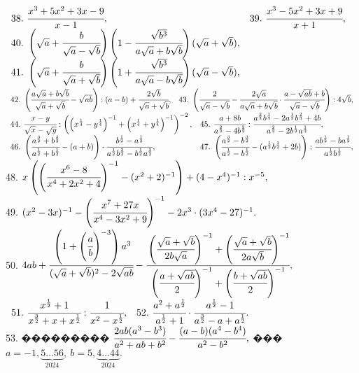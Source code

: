 \documentclass[12pt]{article}
\begin{document}
$\begin{array}{ll}
38.\ \cfrac{x^3+5x^2+3x-9}{x-1},&
39.\ \cfrac{x^3-5x^2+3x+9}{x+1},\\
40.\ \left(\sqrt{a}+\cfrac{b}{\sqrt{a}-\sqrt{b}}\right)\left(1-\cfrac{\sqrt{b^3}}{a\sqrt{a}+b\sqrt{b}}\right)
(\sqrt{a}+\sqrt{b}),\\
41.\ \left(\sqrt{a}+\cfrac{b}{\sqrt{a}+\sqrt{b}}\right)\left(1+\cfrac{\sqrt{b^3}}{a\sqrt{a}-b\sqrt{b}}\right)
(\sqrt{a}-\sqrt{b}),\end{array}$\\
$\begin{array}{ll}
42.\ \left(\cfrac{a\sqrt{a}+b\sqrt{b}}{\sqrt{a}+\sqrt{b}}-\sqrt{ab}\right):(a-b)+\cfrac{2\sqrt{b}}{\sqrt{a}+\sqrt{b}},&
43.\ \left(\cfrac{2}{\sqrt{a}-\sqrt{b}}-\cfrac{2\sqrt{a}}{a\sqrt{a}+b\sqrt{b}}\cdot\cfrac{a-\sqrt{ab}+b}{\sqrt{a}-\sqrt{b}}\right):4\sqrt{b},\end{array}$\\
$\begin{array}{ll}
44.\ \cfrac{x-y}{\sqrt{x}-\sqrt{y}}:\left(\left(x^\frac{1}{4}-y^\frac{1}{4}\right)^{-1}+\left(x^\frac{1}{4}+y^\frac{1}{4}\right)^{-1}\right)^{-2},&
45.\ \cfrac{a+8b}{a^\frac{2}{3}-4b^\frac{2}{3}}:\cfrac{a^\frac{2}{3}b^\frac{1}{3}-2a^\frac{1}{3}b^\frac{2}{3}+4b}{a^\frac{2}{3}-2b^\frac{1}{3}a^\frac{1}{3}},\\
46.\ \left(\cfrac{a^{\frac{3}{2}}+b^{\frac{3}{2}}}{a^{\frac{1}{2}}+b^{\frac{1}{2}}}-(a+b)\right)\cdot\cfrac{b^{\frac{1}{2}}-a^{\frac{1}{2}}}{a^{\frac{1}{2}}b^{\frac{3}{2}}-b^{\frac{1}{2}}a^{\frac{3}{2}}},&
47.\ \left(\cfrac{a^{\frac{3}{2}}-b^{\frac{3}{2}}}{a^{\frac{1}{2}}-b^{\frac{1}{2}}}-(a^{\frac{1}{2}}b^{\frac{1}{2}}+2b)\right):\cfrac{ab^{\frac{1}{2}}-ba^{\frac{1}{2}}}{a^{\frac{1}{2}}b^{\frac{1}{2}}},\\
\end{array}$\\
48. $x\left(\left(\cfrac{x^6-8}{x^4+2x^2+4}\right)^{-1}-(x^2+2)^{-1}\right)+(4-x^4)^{-1}:x^{-5},$\\
49. $(x^2-3x)^{-1}-\left(\cfrac{x^7+27x}{x^4-3x^2+9}\right)^{-1}-2x^3\cdot(3x^4-27)^{-1}.$\\
50. $4ab+\cfrac{\left(1+\left(\cfrac{a}{b}\right)^{-3}\right)a^3}{(\sqrt{a}+\sqrt{b})^2-2\sqrt{ab}}-
\cfrac{\left(\cfrac{\sqrt{a}+\sqrt{b}}{2b\sqrt{a}}\right)^{-1}+
\left(\cfrac{\sqrt{a}+\sqrt{b}}{2a\sqrt{b}}\right)^{-1}}{\left(\cfrac{a+\sqrt{ab}}{2}\right)^{-1}+
\left(\cfrac{b+\sqrt{ab}}{2}\right)^{-1}},$\\
$\begin{array}{ll}
51.\ \cfrac{x^\frac{1}{2}+1}{x^\frac{3}{2}+x+x^\frac{1}{2}}:\cfrac{1}{x^2-x^\frac{1}{2}},&
52.\ \cfrac{a^2+a^\frac{1}{2}}{a^\frac{1}{2}+1}\cdot\cfrac{a^\frac{1}{2}-1}{a^\frac{3}{2}-a+a^\frac{1}{2}}.
\end{array}$\\
53. ��������� $\cfrac{2ab(a^3-b^3)}{a^2+ab+b^2}-\cfrac{(a-b)(a^4-b^4)}{a^2-b^2},$ ��� $a=-1,\underbrace{5\ldots56}_{2024},\ b=5,\underbrace{4\ldots44}_{2024}.$
\newpage
\end{document}
